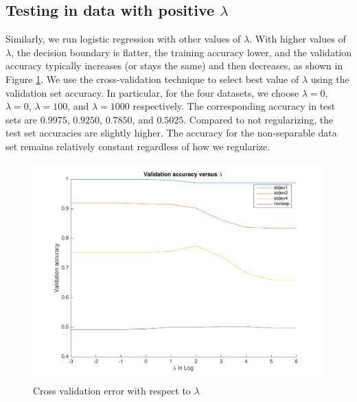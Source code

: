 \subsection{Testing in data with positive $\lambda$}
Similarly, we run logistic regression with other values of $\lambda$. With higher values of $\lambda$, the decision boundary is flatter, the training accuracy lower, and the validation accuracy typically increases (or stays the same) and then decreases, as shown in Figure \ref{fig:LR_cv}. We use the cross-validation technique to select best value of $\lambda$ using the validation set accuracy. In particular, for the four datasets, we choose $\lambda = 0$, $\lambda = 0$, $\lambda = 100$, and $\lambda = 1000$ respectively. The corresponding accuracy in test sets are $0.9975$, $0.9250$, $0.7850$, and $0.5025$. Compared to not regularizing, the test set accuracies are slightly higher. The accuracy for the non-separable data set remains relatively constant regardless of how we regularize. 
\begin{figure}[h!]
\centering
	\includegraphics[scale=0.6]{hw2_1_cv.pdf}
	\caption{Cross validation error with respect to $\lambda$}\label{fig:LR_cv}

\end{figure}
	